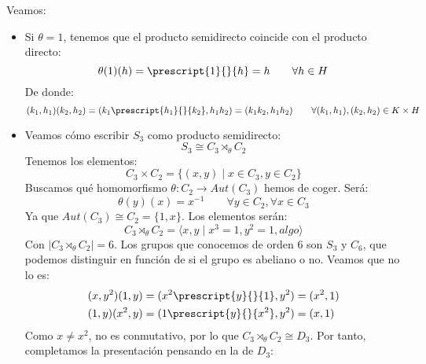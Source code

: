 \begin{ejemplo}
    Veamos:
    \begin{itemize}
        \item Si $\theta = 1$, tenemos que el producto semidirecto coincide con el producto directo:
            \begin{equation*}
                \theta(1)(h) = \prescript{1}{}{h} = h\qquad \forall h\in H
            \end{equation*}
            De donde:
            \begin{equation*}
                (k_1,h_1)(k_2,h_2) = (k_1\prescript{h_1}{}{k_2}, h_1h_2) = (k_1k_2,h_1h_2) \qquad \forall (k_1,h_1),(k_2,h_2)\in K\times H
            \end{equation*}
        \item Veamos cómo escribir $S_3$ como producto semidirecto:
            \begin{equation*}
                S_3 \cong C_3 \rtimes_{\theta} C_2
            \end{equation*}
            Tenemos los elementos:
            \begin{equation*}
                C_3\times C_2 = \{(x,y) \mid x\in C_3, y\in C_2\}
            \end{equation*}
            Buscamos qué homomorfismo $\theta:C_2\to Aut(C_3)$ hemos de coger. Será:
            \begin{equation*}
                \theta(y)(x) = x^{-1} \qquad \forall y\in C_2, \forall x\in C_3
            \end{equation*}
            Ya que $Aut(C_3)\cong C_2 = \{1,x\}$. Los elementos serán:
            \begin{equation*}
                C_3 \rtimes_\theta C_2 = \langle x,y\mid x^3=1, y^2 = 1, algo \rangle 
            \end{equation*}
            Con $|C_3\rtimes_\theta C_2| = 6$. Los grupos que conocemos de orden 6 son $S_3$ y $C_6$, que podemos distinguir en función de si el grupo es abeliano o no. Veamos que no lo es:
            \begin{align*}
                (x,y^2)(1,y) &= (x^2 \prescript{y}{}{1}, y^2) = (x^2,1) \\
                (1,y)(x^2,y) &= (1\prescript{y}{}{x^2}, y^2) = (x, 1)
            \end{align*}
            Como $x\neq x^2$, no es conmutativo, por lo que $C_3\rtimes_\theta C_2\cong D_3$. Por tanto, completamos la presentación pensando en la de $D_3$:
            \begin{equation*}

\end{equation*}
\end{itemize}
\end{ejemplo}

